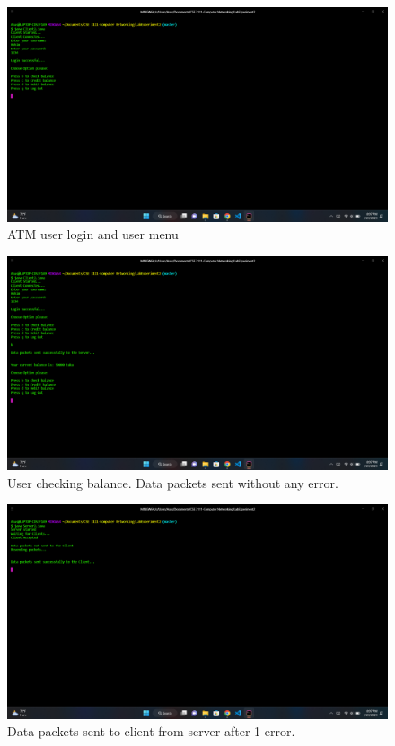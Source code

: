 \documentclass[11pt]{article}
\begin{document}
\newpage


\begin{figure}[!h]
\centering
\includegraphics[width=\textwidth]{119.png}
\caption{ATM user login and user menu}
\end{figure}

\begin{figure}[!h]
\centering
\includegraphics[width=\textwidth]{120.png}
\caption{User checking balance. Data packets sent without any error.}
\end{figure}

\newpage

\begin{figure}[!h]
\centering
\includegraphics[width=\textwidth]{121.png}
\caption{ Data packets sent to client from server after 1 error.}
\end{figure}
\end{document}
